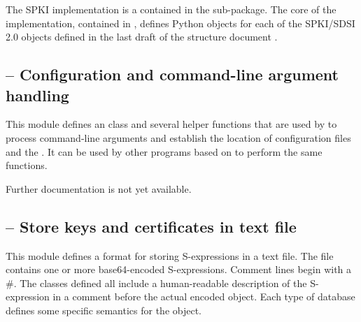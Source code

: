 \documentclass{howto}
\begin{document}
The SPKI implementation is a contained in the 
sub-package.  The core of the implementation, contained in 
, defines Python objects for each of the
SPKI/SDSI 2.0 objects defined in the last draft of the structure
document \cite{ellison99-structure}.

\subsection{
	-- Configuration and command-line argument handling}

This module defines an  class and several helper
functions that are used by  to process
command-line arguments and establish the location of configuration
files and the .  It can be
used by other programs based on  to perform the
same functions.

Further documentation is not yet available.

\subsection{
	-- Store keys and certificates in text file}

This module defines a format for storing S-expressions in a text
file.  The file contains one or more base64-encoded S-expressions.
Comment lines begin with a \#.  The classes defined all include a
human-readable description of the S-expression in a comment before the
actual encoded object.  Each type of database defines some specific
semantics for the object.
\end{document}
